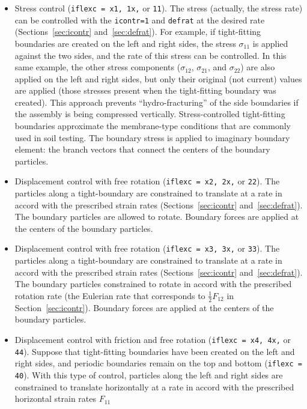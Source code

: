 \documentclass[letterpaper,11pt]{article}
\begin{document}
\begin{itemize}
\item
Stress control (\texttt{iflexc = x1, 1x,} or \texttt{11}).
The stress (actually, the stress rate) can be controlled with
the \texttt{icontr=1} and \texttt{defrat} at the desired rate
(Sections~\ref{sec:icontr} and~\ref{sec:defrat}).
For example, if tight-fitting boundaries are created on the left and
right sides, the stress $\sigma_{11}$ is applied against the two sides,
and the rate of this stress can be controlled.
In this same example, the other stress components ($\sigma_{12}$,
$\sigma_{21}$, and $\sigma_{22}$) are also applied on the left and right
sides, but only their original (not current) values are applied 
(those stresses present when the tight-fitting boundary was created).
This approach prevents ``hydro-fracturing'' of the side boundaries if
the assembly is being compressed vertically.
Stress-controlled tight-fitting boundaries approximate the membrane-type
conditions that are commonly used in soil testing.
The boundary stress is applied to imaginary boundary element: 
the branch vectors that connect the centers of the boundary particles.
\item
Displacement control with free rotation 
(\texttt{iflexc = x2, 2x,} or \texttt{22}).
The particles along a tight-boundary are constrained to translate at
a rate in accord with the prescribed strain rates
(Sections~\ref{sec:icontr} and~\ref{sec:defrat}).
The boundary particles are allowed to rotate.
Boundary forces are applied at the centers of the boundary particles.
\item
Displacement control with free rotation
(\texttt{iflexc = x3, 3x,} or \texttt{33}).
The particles along a tight-boundary are constrained to translate at
a rate in accord with the prescribed strain rates
(Sections~\ref{sec:icontr} and~\ref{sec:defrat}).
The boundary particles constrained to rotate in accord with the
prescribed rotation rate (the Eulerian rate that corresponds
to $\frac{1}{2}F_{12}$ in Section~\ref{sec:icontr}).
Boundary forces are applied at the centers of the boundary particles.
\item
Displacement control with friction and free rotation
(\texttt{iflexc = x4, 4x,} or \texttt{44}).
Suppose that tight-fitting boundaries have been created on the left
and right sides, and periodic boundaries remain on the top and bottom
(\texttt{iflexc = 40}).
With this type of control, particles along the left and right sides
are constrained to translate horizontally at
a rate in accord with the prescribed horizontal strain rates $F_{11}$

\end{itemize}
\end{document}
